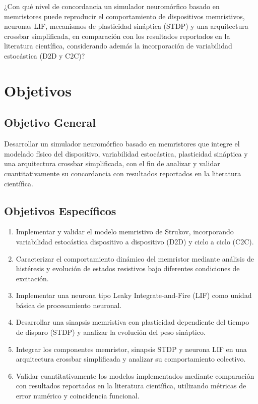 ¿Con qué nivel de concordancia un simulador neuromórfico basado en memristores puede reproducir el comportamiento de dispositivos memristivos, neuronas LIF, mecanismos de plasticidad sináptica (STDP) y una arquitectura crossbar simplificada, en comparación con los resultados reportados en la literatura científica, considerando además la incorporación de variabilidad estocástica (D2D y C2C)?

\section{Objetivos}

\subsection{Objetivo General}

Desarrollar un simulador neuromórfico basado en memristores que integre el modelado físico del dispositivo, variabilidad estocástica, plasticidad sináptica y una arquitectura crossbar simplificada, con el fin de analizar y validar cuantitativamente su concordancia con resultados reportados en la literatura científica.

\subsection{Objetivos Específicos}

\begin{enumerate}

\item Implementar y validar el modelo memristivo de Strukov, incorporando variabilidad estocástica dispositivo a dispositivo (D2D) y ciclo a ciclo (C2C).

\item Caracterizar el comportamiento dinámico del memristor mediante análisis de histéresis y evolución de estados resistivos bajo diferentes condiciones de excitación.

\item Implementar una neurona tipo Leaky Integrate-and-Fire (LIF) como unidad básica de procesamiento neuronal.

\item Desarrollar una sinapsis memristiva con plasticidad dependiente del tiempo de disparo (STDP) y analizar la evolución del peso sináptico.

\item Integrar los componentes memristor, sinapsis STDP y neurona LIF en una arquitectura crossbar simplificada y analizar su comportamiento colectivo.

\item Validar cuantitativamente los modelos implementados mediante comparación con resultados reportados en la literatura científica, utilizando métricas de error numérico y coincidencia funcional.

\end{enumerate}

